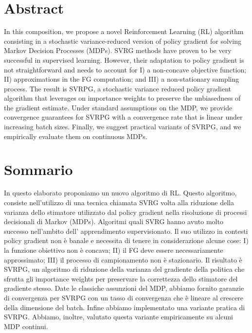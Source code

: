 
\begingroup
\let\clearpage\relax
\let\cleardoublepage\relax
\let\cleardoublepage\relax

\chapter*{Abstract}
In this composition, we propose a novel Reinforcement Learning (\acs{RL}) algorithm consisting in a stochastic variance-reduced version of policy gradient for solving Markov Decision Processes (\acs{MDP}s).\newline
\ac{SVRG} methods have proven to be very successful in supervised learning. However, their adaptation to policy gradient is not straightforward and needs to account for I) a non-concave objective function; II) approximations in the \ac{FG} computation; and III) a non-stationary sampling process. The result is \ac{SVRPG}, a stochastic variance reduced policy gradient algorithm that leverages on importance weights to preserve the unbiasedness of the gradient estimate. Under standard assumptions on the \acs{MDP}, we provide convergence guarantees for \acs{SVRPG} with a convergence rate that is linear under increasing batch sizes. Finally, we suggest practical variants of \acs{SVRPG}, and we empirically evaluate them on continuous \acs{MDP}s.

\vfill
\newpage
{}
\chapter*{Sommario}
In questo elaborato proponiamo un nuovo algoritmo di \ac{RL}. Questo algoritmo, consiste  nell'utilizzo di una tecnica chiamata \ac{SVRG} volta alla riduzione della varianza dello stimatore  utilizzato dal policy gradient nella risoluzione di processi decisionali di Markov (\acs{MDP}s).\newline
Algoritmi quali \acs{SVRG} hanno avuto molto successo nell'ambito dell' apprendimento supervisionato. Il suo utilizzo in contesti policy gradient non è banale e necessita di tenere in considerazione alcune cose: I) la funzione obiettivo non è concava; II) il \ac{FG} deve essere necessariamente approssimato;  III) il processo di campionamento non è stazionario. Il risultato è \ac{SVRPG}, un algoritmo di riduzione della varianza del gradiente della politica che sfrutta gli importance weights per preservare la correttezza dello stimatore del gradiente stesso. Date le classiche assunzioni del \acs{MDP}, abbiamo fornito garanzie di convergenza per \acs{SVRPG} con un tasso di convergenza che è lineare al crescere della dimensione del batch. Infine abbiamo implementato una variante pratica di \acs{SVRPG}. Abbiamo, inoltre, valutato questa variante empiricamente  su alcuni \acs{MDP} continui.

\endgroup